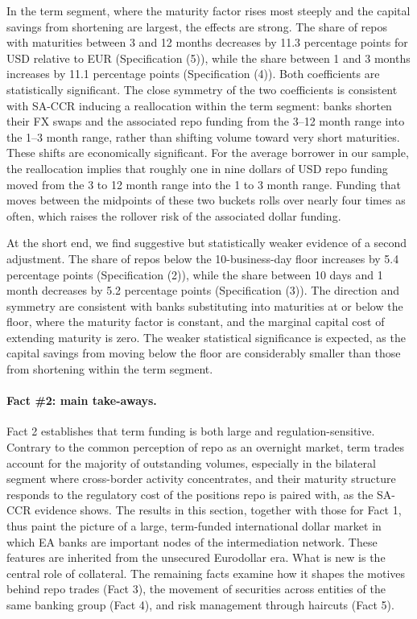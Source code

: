 \documentclass[english, 12pt, oneside]{article}
\begin{document}
In the term segment, where the maturity factor rises most steeply and the capital savings from shortening are largest, the effects are strong. The share of repos with maturities between 3 and 12 months decreases by 11.3 percentage points for USD relative to EUR (Specification (5)), while the share between 1 and 3 months increases by 11.1 percentage points (Specification (4)). Both coefficients are statistically significant. The close symmetry of the two coefficients is consistent with SA-CCR inducing a reallocation within the term segment: banks shorten their FX swaps and the associated repo funding from the 3--12 month range into the 1--3 month range, rather than shifting volume toward very short maturities. These shifts are economically significant. For the average borrower in our sample, the reallocation implies that roughly one in nine dollars of USD repo funding moved from the 3 to 12 month range into the 1 to 3 month range. Funding that moves between the midpoints of these two buckets rolls over nearly four times as often, which raises the rollover risk of the associated dollar funding.

At the short end, we find suggestive but statistically weaker evidence of a second adjustment. The share of repos below the 10-business-day floor increases by 5.4 percentage points (Specification (2)), while the share between 10 days and 1 month decreases by 5.2 percentage points (Specification (3)). The direction and symmetry are consistent with banks substituting into maturities at or below the floor, where the maturity factor is constant, and the marginal capital cost of extending maturity is zero. The weaker statistical significance is expected, as the capital savings from moving below the floor are considerably smaller than those from shortening within the term segment.


\paragraph{Fact \#2: main take-aways.}
Fact 2 establishes that term funding is both large and regulation-sensitive. Contrary to the common perception of repo as an overnight market, term trades account for the majority of outstanding volumes, especially in the bilateral segment where cross-border activity concentrates, and their maturity structure responds to the regulatory cost of the positions repo is paired with, as the SA-CCR evidence shows. The results in this section, together with those for Fact 1, thus paint the picture of a large, term-funded international dollar market in which EA banks are important nodes of the intermediation network. These features are inherited from the unsecured Eurodollar era. What is new is the central role of collateral. The remaining facts examine how it shapes the motives behind repo trades (Fact 3), the movement of securities across entities of the same banking group (Fact 4), and risk management through haircuts (Fact 5).
\end{document}
